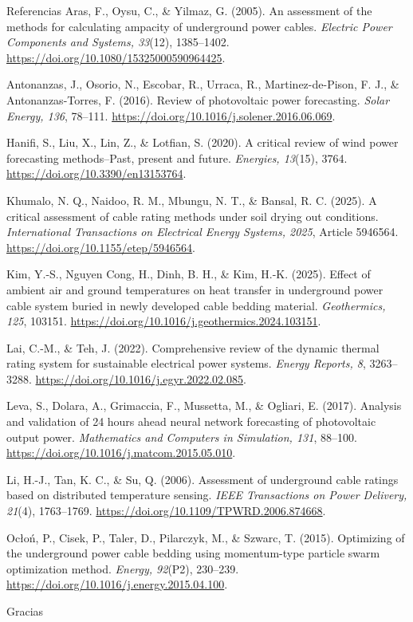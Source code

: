 \documentclass[aspectratio=169]{beamer}
\begin{document}
\begin{frame}[allowframebreaks]{Referencias}
\footnotesize
\justifying
Aras, F., Oysu, C., \& Yilmaz, G. (2005). An assessment of the methods for calculating ampacity of underground power cables. \textit{Electric Power Components and Systems, 33}(12), 1385--1402. \url{https://doi.org/10.1080/15325000590964425}.
\bigskip

Antonanzas, J., Osorio, N., Escobar, R., Urraca, R., Martinez-de-Pison, F. J., \& Antonanzas-Torres, F. (2016). Review of photovoltaic power forecasting. \textit{Solar Energy, 136}, 78--111. \url{https://doi.org/10.1016/j.solener.2016.06.069}.
\bigskip

Hanifi, S., Liu, X., Lin, Z., \& Lotfian, S. (2020). A critical review of wind power forecasting methods--Past, present and future. \textit{Energies, 13}(15), 3764. \url{https://doi.org/10.3390/en13153764}.
\bigskip

Khumalo, N. Q., Naidoo, R. M., Mbungu, N. T., \& Bansal, R. C. (2025). A critical assessment of cable rating methods under soil drying out conditions. \textit{International Transactions on Electrical Energy Systems, 2025}, Article 5946564. \url{https://doi.org/10.1155/etep/5946564}.
\bigskip

Kim, Y.-S., Nguyen Cong, H., Dinh, B. H., \& Kim, H.-K. (2025). Effect of ambient air and ground temperatures on heat transfer in underground power cable system buried in newly developed cable bedding material. \textit{Geothermics, 125}, 103151. \url{https://doi.org/10.1016/j.geothermics.2024.103151}.
\bigskip

Lai, C.-M., \& Teh, J. (2022). Comprehensive review of the dynamic thermal rating system for sustainable electrical power systems. \textit{Energy Reports, 8}, 3263--3288. \url{https://doi.org/10.1016/j.egyr.2022.02.085}.
\bigskip

Leva, S., Dolara, A., Grimaccia, F., Mussetta, M., \& Ogliari, E. (2017). Analysis and validation of 24 hours ahead neural network forecasting of photovoltaic output power. \textit{Mathematics and Computers in Simulation, 131}, 88--100. \url{https://doi.org/10.1016/j.matcom.2015.05.010}.
\bigskip

Li, H.-J., Tan, K. C., \& Su, Q. (2006). Assessment of underground cable ratings based on distributed temperature sensing. \textit{IEEE Transactions on Power Delivery, 21}(4), 1763--1769. \url{https://doi.org/10.1109/TPWRD.2006.874668}.
\bigskip

Ocłoń, P., Cisek, P., Taler, D., Pilarczyk, M., \& Szwarc, T. (2015). Optimizing of the underground power cable bedding using momentum-type particle swarm optimization method. \textit{Energy, 92}(P2), 230--239. \url{https://doi.org/10.1016/j.energy.2015.04.100}.
\end{frame}

\begin{frame}
\centering
\Large Gracias
\end{frame}
\end{document}
